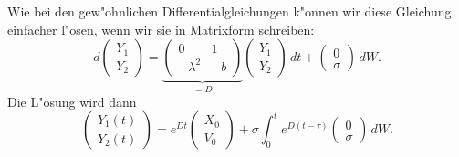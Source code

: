 Wie bei den gew"ohnlichen Differentialgleichungen k"onnen wir diese
Gleichung einfacher l"osen, wenn wir sie in Matrixform schreiben:
\begin{equation}
d\begin{pmatrix}Y_1\\Y_2\end{pmatrix}
=
\underbrace{
\begin{pmatrix}
         0& 1\\
-\lambda^2&-b
\end{pmatrix}}_{\textstyle=D}
\begin{pmatrix}Y_1\\Y_2\end{pmatrix}\,dt
+
\begin{pmatrix}
0\\\sigma
\end{pmatrix}\,dW.
\end{equation}
Die L"osung wird dann
\begin{equation}
\begin{pmatrix}
Y_1(t)\\Y_2(t)
\end{pmatrix}
=
e^{Dt}\begin{pmatrix}X_0\\V_0\end{pmatrix}
+
\sigma \int_0^t e^{D(t-\tau)}\begin{pmatrix}0\\\sigma\end{pmatrix}\,dW.
\label{stochastisch:harmosz-explsg}
\end{equation}

